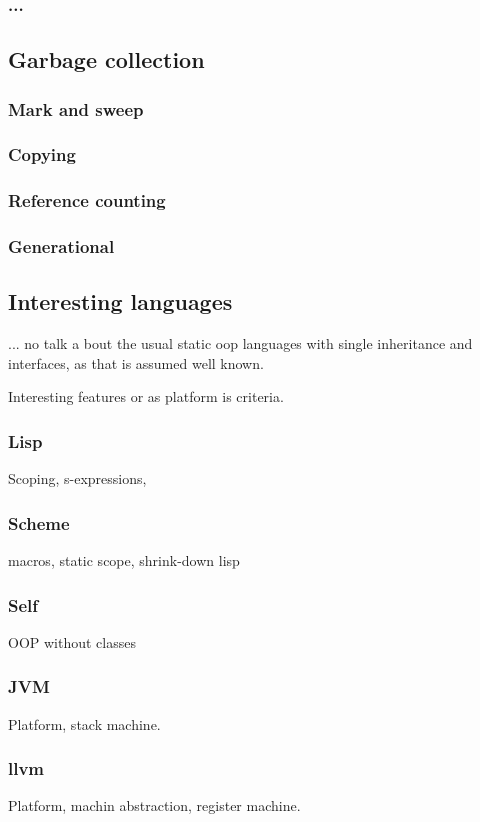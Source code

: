 \subsubsection{...}
\subsection{Garbage collection}
\subsubsection{Mark and sweep}
\subsubsection{Copying}
\subsubsection{Reference counting}
\subsubsection{Generational}
\subsection{Interesting languages}
... no talk a bout the usual static oop languages with single inheritance and interfaces, as that is assumed well known.

Interesting features or as platform is criteria.

\subsubsection{Lisp}
Scoping, s-expressions,
\subsubsection{Scheme}
macros, static scope, shrink-down lisp
\subsubsection{Self}
OOP without classes
\subsubsection{JVM}
Platform, stack machine.
\subsubsection{llvm}
Platform, machin abstraction, register machine.
